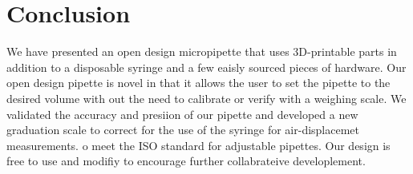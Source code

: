 \documentclass[10pt,letterpaper]{article}
\begin{document}
\section*{Conclusion}
We have presented an open design micropipette that uses 3D-printable parts in addition to a disposable syringe and a few eaisly sourced pieces of hardware.
Our open design pipette is novel in that it allows the user to set the pipette to the desired volume with out the need to calibrate or verify with a weighing scale. 
We validated the accuracy and presiion of our pipette and developed a new graduation scale to correct for the use of the syringe for air-displacemet measurements.
o meet the ISO standard for adjustable pipettes.
Our design is free to use and modifiy to encourage further collabrateive developlement.


\end{document}
